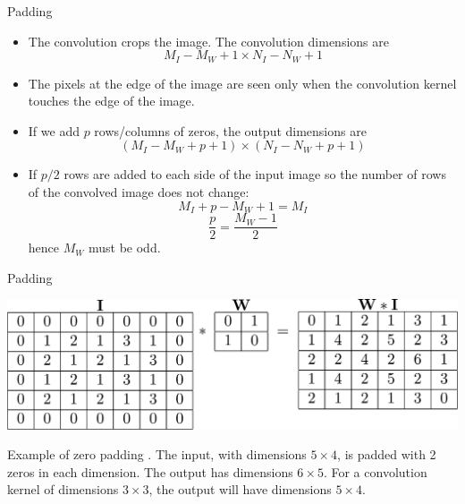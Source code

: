 \documentclass{beamer}
\begin{document}
\begin{frame}{Padding}
    \begin{itemize}
        \item  The convolution crops the image. The convolution dimensions are $$M_I-M_W+1 \times N_I-N_W +1$$ 
    \item The pixels at the edge of the image are seen only when the convolution kernel touches the edge of the image. 
    \item If we add $p$ rows/columns of zeros, the output dimensions are
\begin{equation}
    \left( M_I - M_W + p  + 1 \right)\times\left( N_I - N_W + p  + 1 \right)
\end{equation}
\item If $p/2$ rows are added to each side of the input image so the number of rows of the convolved image does not change: 
 $$M_I+p - M_W+1 = M_I$$ 
 $$\frac{p}{2} = \frac{M_W-1}{2}$$
hence $M_W$ must be odd. 
\end{itemize}
\end{frame}

\begin{frame}{Padding}
    \begin{center}
    \includegraphics[scale=0.35]{Module 4 (CNN)/pics/conv_example2.pdf}
    \end{center}
    Example of zero padding . The input, with dimensions $5\times4$, is padded with 2 zeros in each dimension. The output has dimensions $6 \times 5$.  For a convolution kernel of dimensions $3\times3$, the output will have dimensions $5 \times 4$.
\end{frame}
\end{document}
